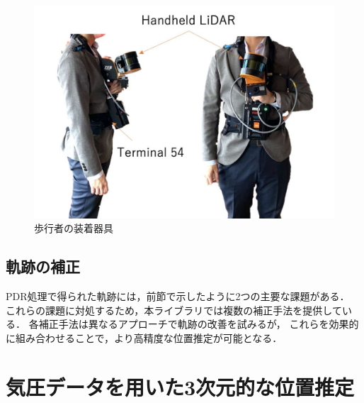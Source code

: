 \begin{figure}[ht]
	\centering
	\includegraphics[width=\linewidth]{../image/lidar.pdf}
	\caption{歩行者の装着器具}    \label{fig:step_detect}
\end{figure}






\subsection{軌跡の補正}

PDR処理で得られた軌跡には，前節で示したように2つの主要な課題がある．
これらの課題に対処するため，本ライブラリでは複数の補正手法を提供している．
各補正手法は異なるアプローチで軌跡の改善を試みるが，
これらを効果的に組み合わせることで，より高精度な位置推定が可能となる．








\section{気圧データを用いた3次元的な位置推定}



